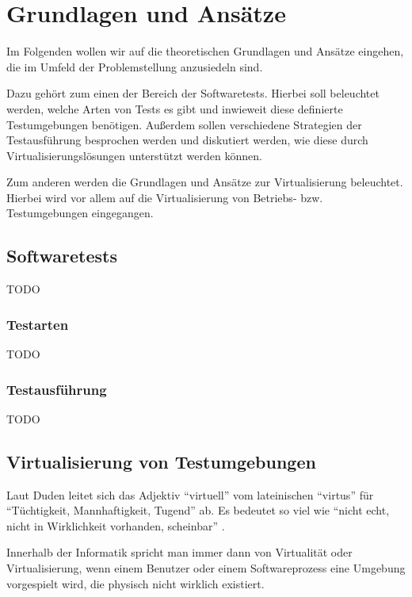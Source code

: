 \section{Grundlagen und Ansätze}

Im Folgenden wollen wir auf die theoretischen Grundlagen und Ansätze eingehen, die im Umfeld der Problemstellung anzusiedeln sind.

Dazu gehört zum einen der Bereich der Softwaretests. Hierbei soll beleuchtet werden, welche Arten von Tests es gibt und inwieweit diese definierte Testumgebungen benötigen. Außerdem sollen verschiedene Strategien der Testausführung besprochen werden und diskutiert werden, wie diese durch Virtualisierungslösungen unterstützt werden können.

Zum anderen werden die Grundlagen und Ansätze zur Virtualisierung beleuchtet. Hierbei wird vor allem auf die Virtualisierung von Betriebs- bzw. Testumgebungen eingegangen.

\subsection{Softwaretests}

TODO

\subsubsection{Testarten}

TODO

\subsubsection{Testausführung}

TODO

\subsection{Virtualisierung von Testumgebungen}

Laut Duden leitet sich das Adjektiv "`virtuell"' vom lateinischen "`virtus"' für "`Tüchtigkeit, Mannhaftigkeit, Tugend"' ab. Es bedeutet so viel wie "`nicht echt, nicht in Wirklichkeit vorhanden, scheinbar"' \citep[Vgl.][]{duden:001}.

Innerhalb der Informatik spricht man immer dann von Virtualität oder Virtualisierung, wenn einem Benutzer oder einem Softwareprozess eine Umgebung vorgespielt wird, die physisch nicht wirklich existiert.

